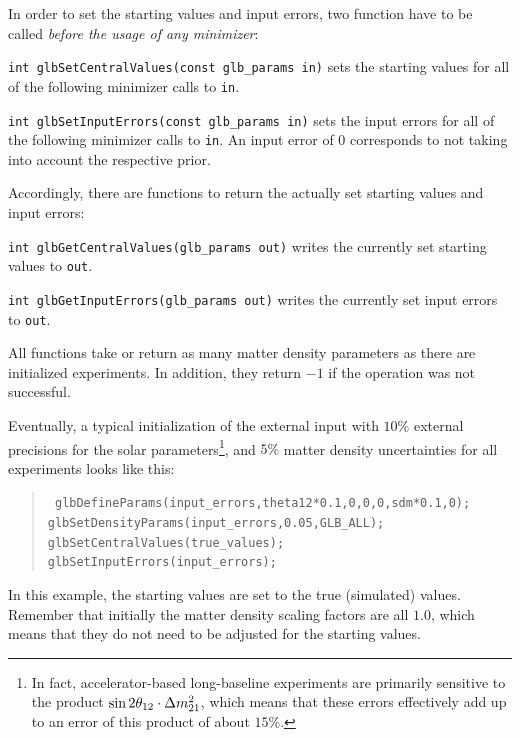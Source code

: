 In order to set the starting values and input errors, two function have to
 be called {\em before the usage of any minimizer}:
\begin{function}
{\tt int glbSetCentralValues(const glb\_params in)} sets the starting values for all of the following minimizer calls to {\tt in}.
\end{function}
\begin{function}
{\tt int glbSetInputErrors(const glb\_params in)}
 sets the input errors for all of the following minimizer calls to {\tt in}.
 An input error of $0$ corresponds to not taking into account the
 respective prior.
\end{function}
Accordingly, there are functions to return the actually set starting values
and input errors:
\begin{function}
{\tt int glbGetCentralValues(glb\_params out)} writes the currently
set starting values to {\tt out}.
\end{function}
\begin{function}
{\tt int glbGetInputErrors(glb\_params out)}
 writes the currently set input errors to {\tt out}.
\end{function}
All functions take or return as many matter density parameters as there are initialized experiments. In addition, they return $-1$ if the operation
was not successful.

Eventually, a typical initialization of the external input with
$10\%$ external precisions for the solar 
parameters\footnote{In fact, accelerator-based long-baseline experiments 
are primarily sensitive to the product $\sin 2 \theta_{12} \cdot \Delta m_{21}^2$, 
which means that these errors effectively add up to an error of this 
product of about $15\%$.}, 
and $5\%$ matter density uncertainties for all experiments looks like this:
\begin{quote}
{\tt
 glbDefineParams(input\_errors,theta12*0.1,0,0,0,sdm*0.1,0);\\  
 glbSetDensityParams(input\_errors,0.05,GLB\_ALL);\\
 glbSetCentralValues(true\_values);\\
 glbSetInputErrors(input\_errors);\\
}
\end{quote}
In this example, the starting values are set to 
the true (simulated) values. Remember that initially the 
matter density scaling factors are 
all $1.0$, which means that they do not need to be adjusted for the
starting values.

